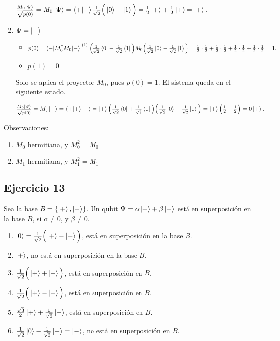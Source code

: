 \documentclass[a4paper,11pt]{article}
\begin{document}
\begin{enumerate}[label=\alph*)]
  $\frac{M_0 \ket{\Psi}}{\sqrt{p(0)}} = M_0 \ket{\Psi} = \braket{+|+} \frac{1}{\sqrt{2}}\Big(\ket{0} + \ket{1}\Big) = 
  \frac{1}{2} \ket{+} + \frac{1}{2} \ket{+} = \ket{+}.$

\item $\Psi = \ket{-}$

  \begin{itemize}
  \item $p(0) = \braket{- | M_0^{\dag} M_0 | -} \stackrel{(1)}{=} 
    \Big(\frac{1}{\sqrt{2}}\bra{0} - \frac{1}{\sqrt{2}}\bra{1} \Big) M_0  \Big(\frac{1}{\sqrt{2}}\ket{0} - \frac{1}{\sqrt{2}}\ket{1} \Big) =
    \frac{1}{2}\cdot\frac{1}{2} + \frac{1}{2}\cdot\frac{1}{2} + \frac{1}{2}\cdot\frac{1}{2} +
    \frac{1}{2}\cdot\frac{1}{2} = 1.$
  \item $p(1) = 0$
  \end{itemize}

  Solo se aplica el proyector $M_0$, pues $p(0) = 1$. El sistema queda en el siguiente estado.
  
  $\frac{M_0 \ket{\Psi}}{\sqrt{p(0)}} = M_0 \ket{-} = \braket{+|+}\ket{-} = \ket{+} \Big(\frac{1}{\sqrt{2}}\bra{0} + 
  \frac{1}{\sqrt{2}}\bra{1}\Big) \Big(\frac{1}{\sqrt{2}}\ket{0} - \frac{1}{\sqrt{2}}\ket{1}\Big) = 
  \ket{+} \Big( \frac{1}{2} - \frac{1}{2} \Big) = 0 \ket{+}.$
  
\end{enumerate}

Observaciones:

\begin{enumerate}[label=(\arabic*)]
\item $M_0$ hermitiana, y $M_0^2 = M_0$
\item $M_1$ hermitiana, y $M_1^2 = M_1$
\end{enumerate}

\subsection*{Ejercicio 13}

Sea la base $B = \{ \ket{+}, \ket{-}\}$. Un qubit $\Psi = \alpha\ket{+} + \beta \ket{-}$ está en superposición en la base $B$, si
$\alpha \neq 0$, y $\beta \neq 0$. 

\begin{enumerate}[label=\alph*)]
\item $\ket{0} = \frac{1}{\sqrt{2}}\Big( \ket{+} - \ket{-}\Big)$, está en superposición en la base $B$.
\item $\ket{+}$, no está en superposición en la base $B$.
\item $\frac{1}{\sqrt{2}}\Big( \ket{+} + \ket{-} \Big)$, está en superposición en $B$.
\item $\frac{1}{\sqrt{2}}\Big( \ket{+} - \ket{-} \Big)$, está en superposición en $B$.
\item $\frac{\sqrt{3}}{2}\ket{+} + \frac{1}{\sqrt{2}}\ket{-}$, está en superposición en $B$.
\item $\frac{1}{\sqrt{2}}\ket{0} - \frac{1}{\sqrt{2}}\ket{-} = \ket{-}$, no está en superposición en $B$.
\end{enumerate}
\end{document}
